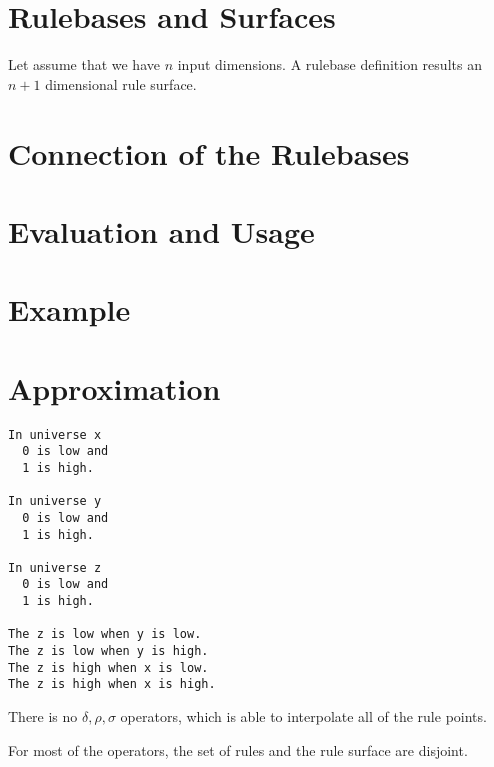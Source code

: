 \documentclass[a4paper,12pt]{article}
\begin{document}
\section{Rulebases and Surfaces}

Let assume that we have $n$ input dimensions. A rulebase definition results an $n + 1$ dimensional rule surface.

\section{Connection of the Rulebases}

\section{Evaluation and Usage}

\section{Example}

\section{Approximation}

\begin{verbatim}
In universe x
  0 is low and
  1 is high.

In universe y
  0 is low and
  1 is high.

In universe z
  0 is low and
  1 is high.

The z is low when y is low.
The z is low when y is high.
The z is high when x is low.
The z is high when x is high.
\end{verbatim}

There is no $\delta, \rho, \sigma$ operators, which is able to interpolate all of the rule points.

For most of the operators, the set of rules and the rule surface are disjoint.
\end{document}

